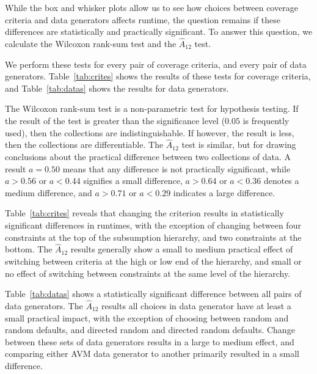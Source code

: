 
While the box and whisker plots allow us to see how choices between coverage criteria and data generators affects
runtime, the question remains if these differences are statistically and practically significant. To answer this
question, we calculate the Wilcoxon rank-sum test and the $\hat{A}_{12}$ test.

We perform these tests for every pair of coverage criteria, and every pair of data generators.  Table~\ref{tab:crites}
shows the results of these tests for coverage criteria, and Table~\ref{tab:datas} shows the results for data generators.

The Wilcoxon rank-sum test is a non-parametric test for hypothesis testing.  If the result of the test is greater than
the significance level ($0.05$ is frequently used), then the collections are indistinguishable.  If however, the result
is less, then the collections are differentiable.  The $\hat{A}_{12}$ test is similar, but for drawing conclusions about
the practical difference between two collections of data.  A result $a=0.5$0 means that any difference is not practically
significant, while $a>0.56$ or $a<0.44$ signifies a small difference, $a>0.64$ or $a<0.36$ denotes a medium difference,
and $a>0.71$ or $a<0.29$ indicates a large difference.

Table~\ref{tab:crites} reveals that changing the criterion results in statistically significant differences in runtimes,
with the exception of changing between four constraints at the top of the subsumption hierarchy, and two constraints at
the bottom.  The $\hat{A}_{12}$ results generally show a small to medium practical effect of switching between criteria
at the high or low end of the hierarchy, and small or no effect of switching between constraints at the same level of the
hierarchy.


Table~\ref{tab:datas} shows a statistically significant difference between all pairs of data generators. The
$\hat{A}_{12}$ results all choices in data generator have at least a small practical impact, with the exception of
choosing between random and random defaults, and directed random and directed random defaults.  Change between these
sets of data generators results in a large to medium effect, and comparing either AVM data generator to another
primarily resulted in a small difference.

